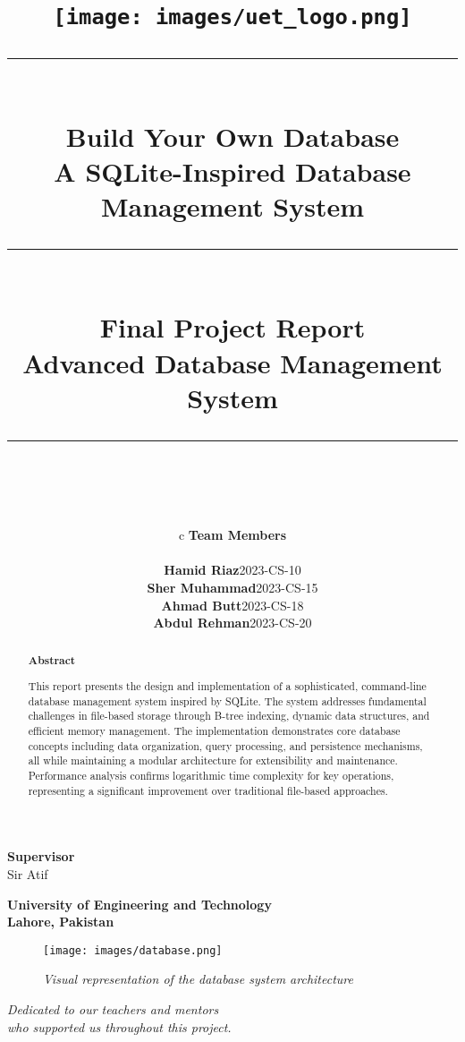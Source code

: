 \documentclass[12pt,a4paper]{article}  %
\title{%
   
    \begin{center}
      \texttt{[image: images/uet\_logo.png]}\\[0.5cm]
        \rule{\linewidth}{2pt}\\[0.4cm]
        {\huge\bfseries\textcolor{uetblue}{Build Your Own Database}}\\[0.3cm]
        {\Large A SQLite-Inspired Database Management System}\\[0.5cm]
        \vspace{0.3cm}
        \rule{\linewidth}{1.2pt}\\[0.3cm]
        {\large Final Project Report}\\
        {\large Advanced Database Management System}\\
        \vspace{0.5cm}
        \rule{\linewidth}{2pt}\\
    \end{center}
}
\author{%
    \begin{tabular}{c}
        \large\textbf{Team Members} \\[0.4cm]
        \begin{tabular}{rc}
            \textbf{Hamid Riaz} & 2023-CS-10 \\[0.3cm]
            \textbf{Sher Muhammad} & 2023-CS-15 \\[0.3cm]
            \textbf{Ahmad Butt} & 2023-CS-18 \\[0.3cm]
            \textbf{Abdul Rehman} & 2023-CS-20
        \end{tabular}
    \end{tabular}
}
\date{}
\begin{document}


\begin{titlepage}
    \maketitle

    \begin{center}
        \large\textbf{Supervisor}\\
        \large{Sir Atif}
        \vspace{0.3cm}


        \Large \textbf{University of Engineering and Technology}\\
        \large \textbf{Lahore, Pakistan}
    \end{center}

    \vfill

    \begin{abstract}
        \begin{center}
            \Large\textbf{Abstract}
        \end{center}
        \vspace{0.3cm}
        \noindent This report presents the design and implementation of a sophisticated, command-line database management system inspired by SQLite. The system addresses fundamental challenges in file-based storage through B-tree indexing, dynamic data structures, and efficient memory management. The implementation demonstrates core database concepts including data organization, query processing, and persistence mechanisms, all while maintaining a modular architecture for extensibility and maintenance. Performance analysis confirms logarithmic time complexity for key operations, representing a significant improvement over traditional file-based approaches.
    \end{abstract}

    \vfill
    \begin{figure}[h]
        \centering
        \texttt{[image: images/database.png]}
        \caption*{\textit{Visual representation of the database system architecture}}
    \end{figure}
\end{titlepage}


\begin{center}
    \vspace*{5cm}
    \large\textit{Dedicated to our teachers and mentors\\
    who supported us throughout this project.}
    \vspace{2cm}
\end{center}
\end{document}
